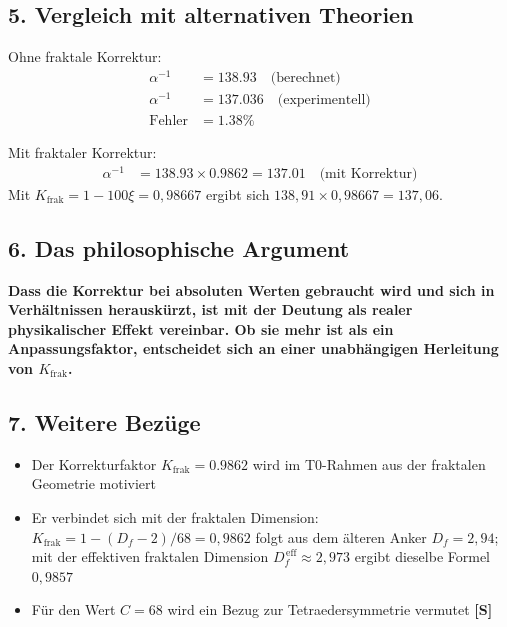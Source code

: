 \subsection{5. Vergleich mit alternativen Theorien}

Ohne fraktale Korrektur:
\begin{align*}
	\alpha^{-1} &= 138.93 \quad \text{(berechnet)} \\
	\alpha^{-1} &= 137.036 \quad \text{(experimentell)} \\
	\text{Fehler} &= 1.38\%
\end{align*}

Mit fraktaler Korrektur:
\begin{align*}
	\alpha^{-1} &= 138.93 \times 0.9862 = 137.01 \quad \text{(mit Korrektur)}
\end{align*}
Mit $K_{\text{frak}} = 1-100\xi = 0{,}98667$ ergibt sich $138{,}91\times0{,}98667 = 137{,}06$.

\subsection{6. Das philosophische Argument}

\begin{tcolorbox}[colback=blue!5!white,colframe=blue!75!black]
	\textbf{Dass die Korrektur bei absoluten Werten gebraucht wird und sich in Verhältnissen herauskürzt, ist mit der Deutung als realer physikalischer Effekt vereinbar. Ob sie mehr ist als ein Anpassungsfaktor, entscheidet sich an einer unabhängigen Herleitung von $K_{\text{frak}}$.}
\end{tcolorbox}

\subsection{7. Weitere Bezüge}

\begin{itemize}
	\item Der Korrekturfaktor $K_{\text{frak}} = 0.9862$ wird im T0-Rahmen aus der fraktalen Geometrie motiviert
	\item Er verbindet sich mit der fraktalen Dimension: $K_{\text{frak}} = 1-(D_f-2)/68 = 0{,}9862$ folgt aus dem älteren Anker $D_f = 2{,}94$; mit der effektiven fraktalen Dimension $D_f^{\,\text{eff}} \approx 2{,}973$ ergibt dieselbe Formel $0{,}9857$
	\item Für den Wert $C = 68$ wird ein Bezug zur Tetraedersymmetrie vermutet \textbf{[S]}
\end{itemize}

